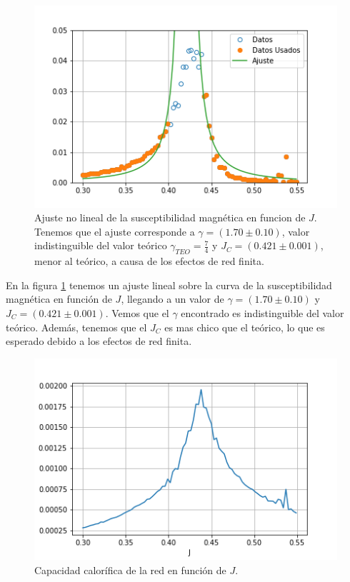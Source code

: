 \documentclass[
 reprint,
 amsmath,amssymb,
 aps,
]{revtex4-1}
\begin{document}
\begin{figure}
  \includegraphics[width=1.0\columnwidth]{images/ajuste_gamma.png}
  \caption{Ajuste no lineal de la susceptibilidad magn\'etica en funcion de $J$.
  Tenemos que el ajuste corresponde a $\gamma = (1.70 \pm 0.10)$, valor
  indistinguible del valor te\'orico $\gamma_{TEO} = \frac{7}{4}$ y $J_C =
  (0.421 \pm 0.001)$, menor al te\'orico, a causa de los efectos de red finita.}
  \label{ajuste_gamma}
\end{figure}

En la figura \ref{ajuste_gamma} tenemos un ajuste lineal sobre la curva de la
susceptibilidad magn\'etica en funci\'on de $J$, llegando a un valor de $\gamma
= (1.70 \pm 0.10)$ y $J_C = (0.421 \pm 0.001)$. Vemos que el $\gamma$ encontrado es indistinguible del valor te\'orico. Adem\'as, tenemos que el $J_C$ es mas
chico que el te\'orico, lo que es esperado debido a los efectos de red finita.

\begin{figure}
  \includegraphics[width=1.0\columnwidth]{images/c_vs_j.png}
  \caption{Capacidad calor\'ifica de la red en funci\'on de $J$.}
  \label{c_vs_j}
\end{figure}
\end{document}
